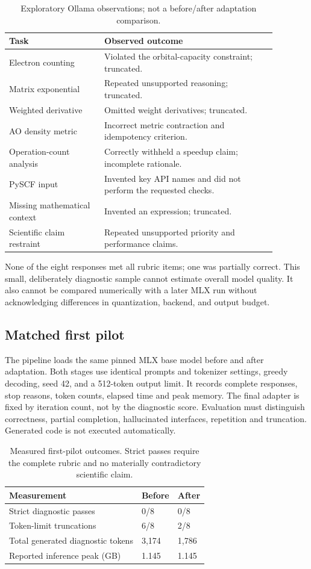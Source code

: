 \documentclass[11pt]{article}
\begin{document}
\begin{table}[ht]
\centering
\caption{Exploratory Ollama observations; not a before/after adaptation comparison.}
\label{tab:diagnostics}
\begin{tabular}{p{0.31\linewidth}p{0.57\linewidth}}
\toprule
Task & Observed outcome \\
\midrule
Electron counting & Violated the orbital-capacity constraint; truncated. \\
Matrix exponential & Repeated unsupported reasoning; truncated. \\
Weighted derivative & Omitted weight derivatives; truncated. \\
AO density metric & Incorrect metric contraction and idempotency criterion. \\
Operation-count analysis & Correctly withheld a speedup claim; incomplete rationale. \\
PySCF input & Invented key API names and did not perform the requested checks. \\
Missing mathematical context & Invented an expression; truncated. \\
Scientific claim restraint & Repeated unsupported priority and performance claims. \\
\bottomrule
\end{tabular}
\end{table}

None of the eight responses met all rubric items; one was partially correct.
This small, deliberately diagnostic sample cannot estimate overall model
quality. It also cannot be compared numerically with a later MLX run without
acknowledging differences in quantization, backend, and output budget.

\subsection{Matched first pilot}
The pipeline loads the same pinned MLX base model before and after
adaptation. Both stages use identical prompts and tokenizer settings,
greedy decoding, seed 42, and a 512-token output limit. It records complete
responses, stop reasons, token counts, elapsed time and peak memory.
The final adapter is fixed by iteration count, not by the diagnostic score.
Evaluation must distinguish correctness, partial completion, hallucinated
interfaces, repetition and truncation. Generated code is not executed
automatically.

\begin{table}[ht]
\centering
\caption{Measured first-pilot outcomes. Strict passes require the complete
rubric and no materially contradictory scientific claim.}
\begin{tabular}{lll}
\toprule
Measurement & Before & After \\
\midrule
Strict diagnostic passes & 0/8 & 0/8 \\
Token-limit truncations & 6/8 & 2/8 \\
Total generated diagnostic tokens & 3,174 & 1,786 \\
Reported inference peak (GB) & 1.145 & 1.145 \\
\bottomrule
\end{tabular}
\end{table}
\end{document}
